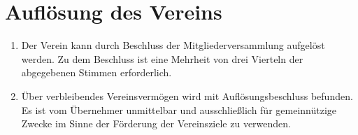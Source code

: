 \documentclass[12pt,a4paper,draft]{article}
\begin{document}
\section{Auflösung des Vereins}
\begin{enumerate}
\item Der Verein kann durch Beschluss der Mitgliederversammlung aufgelöst 
werden. Zu dem Beschluss ist eine Mehrheit von drei Vierteln der abgegebenen 
Stimmen erforderlich. %

\item Über verbleibendes Vereinsvermögen wird mit Auflösungsbeschluss befunden. 
Es ist vom Übernehmer unmittelbar und ausschließlich für gemeinnützige Zwecke 
im Sinne der Förderung der Vereinsziele zu verwenden. %
\end{enumerate}
\end{document}
